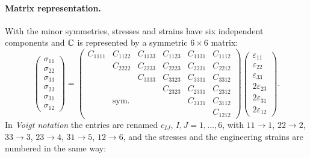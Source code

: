 \paragraph{Matrix representation.} With the minor symmetries, stresses and
%
strains have six independent components and $\mathbb{C}$ is represented by a
symmetric $6\times6$ matrix:
\begin{equation}\label{eq:voigt}
 \begin{pmatrix}\sigma_{11}\\ \sigma_{22}\\ \sigma_{33}\\ \sigma_{23}\\ \sigma_{31}\\ \sigma_{12}\end{pmatrix}
 =
 \begin{pmatrix}
   C_{1111} & C_{1122} & C_{1133} & C_{1123} & C_{1131} & C_{1112} \\
            & C_{2222} & C_{2233} & C_{2223} & C_{2231} & C_{2212} \\
            &          & C_{3333} & C_{3323} & C_{3331} & C_{3312} \\
            &          &          & C_{2323} & C_{2331} & C_{2312} \\
            & \text{sym.} &       &          & C_{3131} & C_{3112} \\
            &          &          &          &          & C_{1212}
 \end{pmatrix}
 \begin{pmatrix}\varepsilon_{11}\\ \varepsilon_{22}\\ \varepsilon_{33}\\ 2\varepsilon_{23}\\ 2\varepsilon_{31}\\ 2\varepsilon_{12}\end{pmatrix}.
\end{equation}
In \emph{Voigt notation} the entries are renamed $c_{IJ}$, $I,J=1,\dots,6$,
with $11\to1$, $22\to2$, $33\to3$, $23\to4$, $31\to5$, $12\to6$, and the
stresses and the engineering strains are numbered in the same way:

